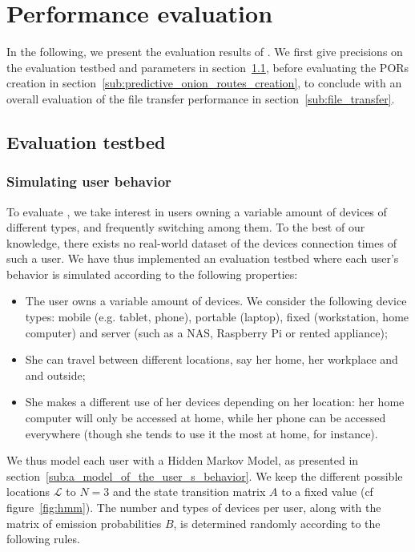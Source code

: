 \section{Performance evaluation}%
\label{Performance}

In the following, we present the evaluation results of \name. 
We first give precisions on the evaluation testbed and parameters in section~\ref{sub:evaluation_testbed}, before evaluating the PORs creation  in section~\ref{sub:predictive_onion_routes_creation}, to conclude with an overall evaluation of the file transfer performance in section~\ref{sub:file_transfer}.

\subsection{Evaluation testbed} %
\label{sub:evaluation_testbed}

\subsubsection{Simulating user behavior} %
\label{ssub:simulating_user_behavior}


To evaluate \name, we take interest in users owning a variable amount of devices of different types, and frequently switching among them.
To the best of our knowledge, there exists no real-world dataset of the devices connection times of such a user.
We have thus implemented an evaluation testbed where each user's behavior is simulated  according to the following properties:
\begin{itemize}
	\item The user owns a variable amount of devices. We consider the following device types: mobile (e.g. tablet, phone), portable (laptop), fixed (workstation, home computer) and server (such as a NAS, Raspberry Pi or rented appliance);
	\item She can travel between different locations, say her home, her workplace and and outside;
	\item She makes a different use of her devices depending on her location: her home computer will only be accessed at home, while her phone can be accessed everywhere (though she tends to use it the most at home, for instance).
\end{itemize}

We thus model each user with a Hidden Markov Model, as presented in section~\ref{sub:a_model_of_the_user_s_behavior}.
We keep the different possible locations $\mathcal{L}$ to $N=3$ and the state transition matrix $A$ to a fixed value (cf figure~\ref{fig:hmm}).
The number and types of devices per user, along with the matrix of emission probabilities $B$, is determined randomly according to the following rules.

